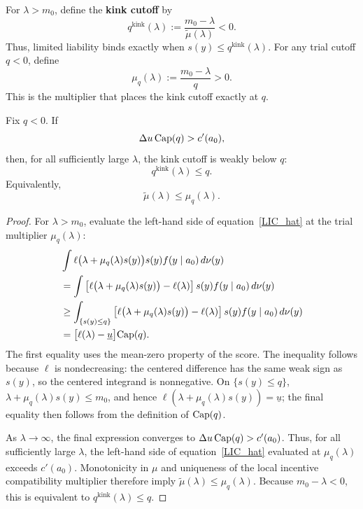 For $\lambda>m_0$, define the \textbf{kink cutoff} by
\[
    q^{\mathrm{kink}}(\lambda)
    :=\frac{m_0-\lambda}{\widetilde\mu(\lambda)}<0.
\]
Thus, limited liability binds exactly when
$s(y)\leq q^{\mathrm{kink}}(\lambda)$.  For any trial cutoff $q<0$, define
\begin{equation}
    \mu_q(\lambda):=\frac{m_0-\lambda}{q}>0.
    \label{eq:trial-multiplier}
\end{equation}
This is the multiplier that places the kink cutoff exactly at $q$.

\begin{lemma}
\label{lem:kink-placement}
Fix $q<0$.  If
\[
    \Delta u\,\mathrm{Cap}(q)>c'(a_0),
\]
then, for all sufficiently large $\lambda$, the kink cutoff is weakly below
$q$:
\[
    q^{\mathrm{kink}}(\lambda)\leq q.
\]
Equivalently,
\[
    \widetilde\mu(\lambda)\leq\mu_q(\lambda).
\]
\end{lemma}

\begin{proof}
For $\lambda>m_0$, evaluate the left-hand side of equation~\eqref{LIC_hat} at the trial multiplier
$\mu_q(\lambda)$:
\begin{align*}
 &\int \ell\bigl(\lambda+\mu_q(\lambda)s(y)\bigr)s(y)
 f(y\mid a_0)\,d\nu(y)\\
 &=\int\left[\ell\bigl(\lambda+\mu_q(\lambda)s(y)\bigr)
              -\ell(\lambda)\right]s(y)f(y\mid a_0)\,d\nu(y)\\
 &\geq\int_{\{s(y)\leq q\}}
 \left[\ell\bigl(\lambda+\mu_q(\lambda)s(y)\bigr)
              -\ell(\lambda)\right]s(y)f(y\mid a_0)\,d\nu(y)\\
 &=\bigl[\ell(\lambda)-\underline u\bigr]\mathrm{Cap}(q).
\end{align*}
The first equality uses the mean-zero property of the score.  The inequality
follows because $\ell$ is nondecreasing: the centered difference has the same
weak sign as $s(y)$, so the centered integrand is nonnegative.  On $\{s(y)\leq q\}$,
$\lambda+\mu_q(\lambda)s(y)\leq m_0$, and hence
$\ell(\lambda+\mu_q(\lambda)s(y))=\underline u$; the final equality then
follows from the definition of $\mathrm{Cap}(q)$.

As $\lambda\to\infty$, the final expression converges to
$\Delta u\,\mathrm{Cap}(q)>c'(a_0)$.  Thus, for all sufficiently large $\lambda$, the
left-hand side of equation~\eqref{LIC_hat} evaluated at $\mu_q(\lambda)$
exceeds $c'(a_0)$.  Monotonicity in $\mu$ and uniqueness of the local
incentive compatibility multiplier therefore imply
$\widetilde\mu(\lambda)\leq\mu_q(\lambda)$.  Because $m_0-\lambda<0$, this
is equivalent to $q^{\mathrm{kink}}(\lambda)\leq q$.
\end{proof}

